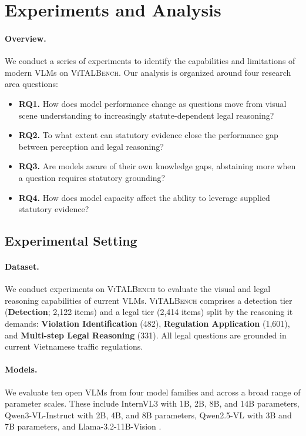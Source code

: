 \section{Experiments and Analysis}
\label{sec:experiments}

\paragraph{Overview.}
We conduct a series of experiments to identify the capabilities and limitations of modern VLMs on \textsc{ViTALBench}. Our analysis is organized around four research area questions:

\begin{itemize}
\item \textbf{RQ1.} How does model performance change as questions move from visual scene understanding to increasingly statute-dependent legal reasoning?

\item \textbf{RQ2.} To what extent can statutory evidence close the
performance gap between perception and legal reasoning?

\item \textbf{RQ3.} Are models aware of their own knowledge gaps, abstaining
more when a question requires statutory grounding?
\item \textbf{RQ4.} How does model capacity affect the ability to leverage supplied statutory evidence?

\end{itemize}


\subsection{Experimental Setting}

\paragraph{Dataset.}
We conduct experiments on \textsc{ViTALBench} to evaluate the visual and legal reasoning capabilities of current VLMs. \textsc{ViTALBench} comprises a detection tier (\textbf{Detection}; 2{,}122 items) and a legal tier (2{,}414 items) split by the reasoning it demands: \textbf{Violation Identification} (482), \textbf{Regulation Application} (1{,}601), and \textbf{Multi-step Legal Reasoning} (331). All legal questions are grounded in current Vietnamese traffic regulations.

\paragraph{Models.}
We evaluate ten open VLMs from four model families and across a broad range of parameter scales. These include InternVL3 \cite{zhu2025internvl3exploringadvancedtraining} with 1B, 2B, 8B, and 14B parameters, Qwen3-VL-Instruct \cite{bai2025qwen3vltechnicalreport} with 2B, 4B, and 8B parameters, Qwen2.5-VL \cite{bai2025qwen25vltechnicalreport} with 3B and 7B parameters, and Llama-3.2-11B-Vision \cite{touvron2023llamaopenefficientfoundation}.

